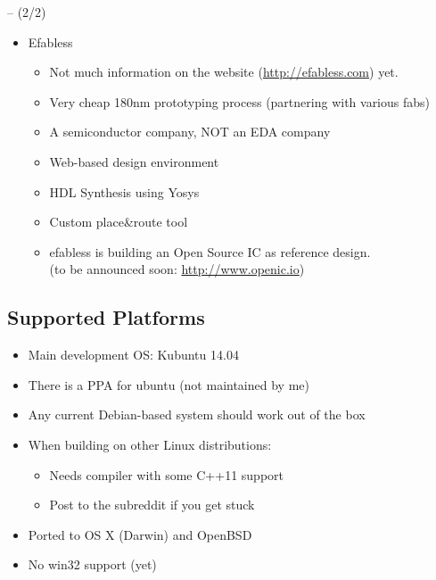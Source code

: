 \begin{frame}{\subsecname{} -- (2/2)}
\begin{itemize}
\item Efabless
\begin{itemize}
\smallskip \item Not much information on the website (\url{http://efabless.com}) yet.
\smallskip \item Very cheap 180nm prototyping process (partnering with various fabs)
\smallskip \item A semiconductor company, NOT an EDA company
\smallskip \item Web-based design environment
\smallskip \item HDL Synthesis using Yosys
\smallskip \item Custom place\&route tool

\bigskip
\item efabless is building an Open Source IC as reference design. \\
\hskip1cm (to be announced soon: \url{http://www.openic.io})
\end{itemize}
\end{itemize}
\end{frame}


\subsection{Supported Platforms}

\begin{frame}{\subsecname}
\begin{itemize}
\item Main development OS: Kubuntu 14.04
\item There is a PPA for ubuntu (not maintained by me)
\item Any current Debian-based system should work out of the box
\item When building on other Linux distributions:
\begin{itemize}
\item Needs compiler with some C++11 support
\item Post to the subreddit if you get stuck
\end{itemize}
\item Ported to OS X (Darwin) and OpenBSD
\item No win32 support (yet)
\end{itemize}
\end{frame}

